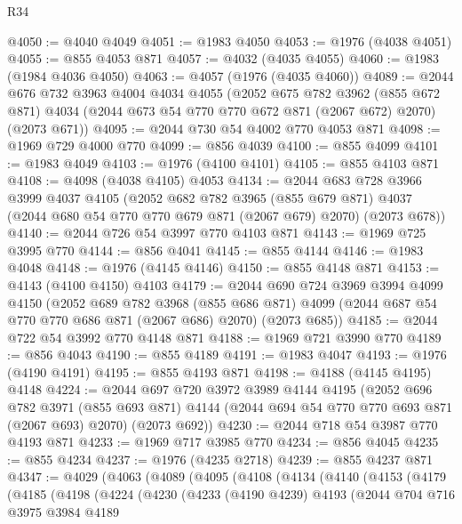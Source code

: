 \begin{lexlean}{R34}
\begin{coremodule}
@4050 := @4040 @4049
@4051 := @1983 @4050
@4053 := @1976 (@4038 @4051)
@4055 := @855 @4053 @871
@4057 := @4032 (@4035 @4055)
@4060 := @1983 (@1984 @4036 @4050)
@4063 := @4057 (@1976 (@4035 @4060))
@4089 := @2044
    @676
    @732
    @3963
    @4004
    @4034
    @4055
    (@2052
      @675
      @782
      @3962
      (@855 @672 @871)
      @4034
      (@2044 @673 @54 @770 @770 @672 @871 (@2067 @672) @2070)
      (@2073 @671))
@4095 := @2044 @730 @54 @4002 @770 @4053 @871
@4098 := @1969 @729 @4000 @770
@4099 := @856 @4039
@4100 := @855 @4099
@4101 := @1983 @4049
@4103 := @1976 (@4100 @4101)
@4105 := @855 @4103 @871
@4108 := @4098 (@4038 @4105) @4053
@4134 := @2044
    @683
    @728
    @3966
    @3999
    @4037
    @4105
    (@2052
      @682
      @782
      @3965
      (@855 @679 @871)
      @4037
      (@2044 @680 @54 @770 @770 @679 @871 (@2067 @679) @2070)
      (@2073 @678))
@4140 := @2044 @726 @54 @3997 @770 @4103 @871
@4143 := @1969 @725 @3995 @770
@4144 := @856 @4041
@4145 := @855 @4144
@4146 := @1983 @4048
@4148 := @1976 (@4145 @4146)
@4150 := @855 @4148 @871
@4153 := @4143 (@4100 @4150) @4103
@4179 := @2044
    @690
    @724
    @3969
    @3994
    @4099
    @4150
    (@2052
      @689
      @782
      @3968
      (@855 @686 @871)
      @4099
      (@2044 @687 @54 @770 @770 @686 @871 (@2067 @686) @2070)
      (@2073 @685))
@4185 := @2044 @722 @54 @3992 @770 @4148 @871
@4188 := @1969 @721 @3990 @770
@4189 := @856 @4043
@4190 := @855 @4189
@4191 := @1983 @4047
@4193 := @1976 (@4190 @4191)
@4195 := @855 @4193 @871
@4198 := @4188 (@4145 @4195) @4148
@4224 := @2044
    @697
    @720
    @3972
    @3989
    @4144
    @4195
    (@2052
      @696
      @782
      @3971
      (@855 @693 @871)
      @4144
      (@2044 @694 @54 @770 @770 @693 @871 (@2067 @693) @2070)
      (@2073 @692))
@4230 := @2044 @718 @54 @3987 @770 @4193 @871
@4233 := @1969 @717 @3985 @770
@4234 := @856 @4045
@4235 := @855 @4234
@4237 := @1976 (@4235 @2718)
@4239 := @855 @4237 @871
@4347 := @4029
    (@4063
      (@4089
        (@4095
          (@4108
            (@4134
              (@4140
                (@4153
                  (@4179
                    (@4185
                      (@4198
                        (@4224
                          (@4230
                            (@4233
                              (@4190 @4239)
                              @4193
                              (@2044
                                @704
                                @716
                                @3975
                                @3984
                                @4189

\end{coremodule}
\end{lexlean}
